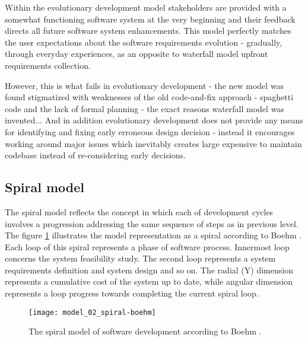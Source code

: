 Within the evolutionary development model stakeholders are provided with a somewhat 
functioning software system at the very beginning and their feedback directs all future
software system enhancements. This model perfectly matches the user expectations 
about the software requirements evolution - gradually, through everyday experiences, 
as an opposite to waterfall model upfront requirements collection. 

However, this is what fails in evolutionary development - the new model was found 
stigmatized with weaknesses of the old code-and-fix approach - spaghetti code and 
the lack of formal planning - the exact reasons waterfall model was invented... 
And in addition evolutionary development does not provide any means for identifying 
and fixing early erroneous design decision - instead it encourages working around 
major issues which inevitably creates large expensive to maintain codebase instead 
of re-considering early decisions.


\subsection{Spiral model}
The spiral model reflects the concept in which each of development cycles involves a 
progression addressing the same sequence of steps as in previous level. The figure 
\ref{fig:model_spiral} illustrates the model representation as a spiral according 
to Boehm \cite{citeulike:10002126}. Each loop of this spiral represents a phase of 
software process. Innermost loop concerns the system feasibility study. The second 
loop represents a system requirements definition and system design and so on. 
The radial (Y) dimension represents a cumulative cost of the system up to date, 
while angular dimension represents a loop progress towards completing the current 
spiral loop.

\begin{figure}[tbp]
   \centering
   \texttt{[image: model\_02\_spiral-boehm]}
   \caption{The spiral model of software development according to Boehm \cite{citeulike:10002126}. }
   \label{fig:model_spiral}
\end{figure}



